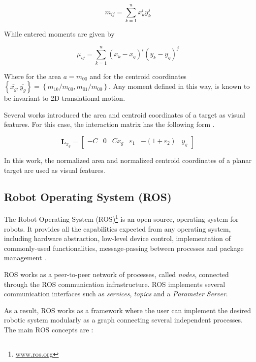 \begin{equation}
m_{ij} = \sum_{k=1}^n x_k^i y_k^j
\end{equation}

While entered moments are given by

\begin{equation}
\mu _{ij} = \sum_{k=1}^n \left( x_k - x_g \right)^i \left( y_k - y_g \right)^j
\end{equation}

Where for the area $a = m_{00}$ and for the centroid coordinates $\left\lbrace \bar{x_g}, \bar{y_g} \right\rbrace = \left\lbrace m_{10}/m_{00}, m_{01}/m_{00} \right\rbrace $. Any moment defined in this way, is known to be invariant to 2D translational motion. 

Several works \cite{bourquardez_2009} \cite{tahri_2005} introduced the area and centroid coordinates of a target as visual features. For this case, the interaction matrix has the following form \cite{tahri_2005}.

\begin{equation}
\bm{L}_{x_g} = \begin{bmatrix} -C & 0 & C x_g & \varepsilon_1 & -(1+\varepsilon_2) & y_g \end{bmatrix}
\end{equation}

In this work, the normalized area and normalized centroid coordinates of a planar target are used as visual features. 

\subsection{Robot Operating System (ROS)}
\label{sec:ROS_theory}

The Robot Operating System (ROS)\footnote{\url{www.ros.org}} is an open-source, operating system for robots. It provides all the capabilities expected from any operating system, including hardware abstraction, low-level device control, implementation of commonly-used functionalities, message-passing between processes and package management \cite{ROS_Intro}.

ROS works as a peer-to-peer network of processes, called \emph{nodes}, connected through the ROS communication infrastructure. ROS implements several communication interfaces such as \emph{services}, \emph{topics} and a \emph{Parameter Server}.

As a result, ROS works as a framework where the user can implement the desired robotic system modularly as a graph connecting several independent processes. The main ROS concepts are \cite{ROS_Concepts}:

